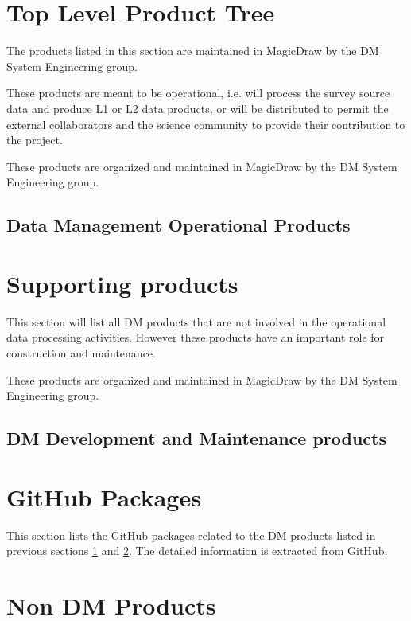 \newpage
\section{Top Level Product Tree}\label{sec:top}

The products listed in this section are maintained in MagicDraw by the DM System Engineering group. 

These products are meant to be operational, i.e. will process the survey source data and produce L1 or L2 data products, or will be distributed to permit the external collaborators and the science community to provide their contribution to the project.

These products are organized and maintained in MagicDraw by the DM System Engineering group.

\newpage
\subsection{Data Management Operational Products}\label{sec:dmtop}




\newpage
\section{Supporting products}\label{sec:sups}

This section will list all DM products that are not involved in the operational data processing activities. 
However these products have an important role for construction and maintenance.

These products are organized and maintained in MagicDraw by the DM System Engineering group.
\newpage
\subsection{DM Development and Maintenance products}



\newpage
\section{GitHub Packages}\label{sec:low}

This section lists the GitHub packages related to the DM products listed in previous sections \ref{sec:top} and \ref{sec:sups}.
The detailed information is extracted from GitHub.




\newpage
\section{Non DM Products}\label{sec:nondm}

